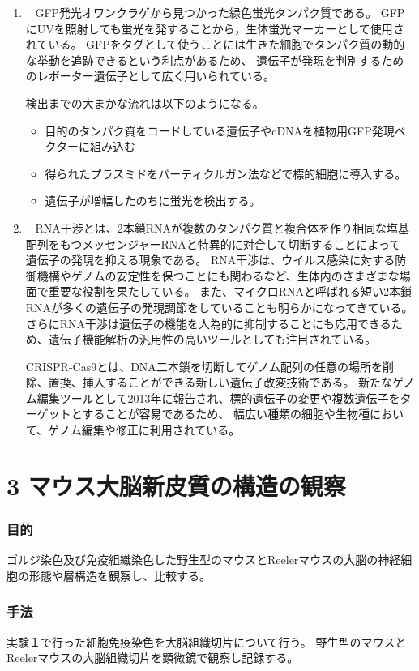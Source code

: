 \documentclass[a4paper,papersize,dvipdfmx]{jsarticle}
\newcommand{\mon}[1]{\item[({#1})] \ }
\begin{document}
\begin{enumerate}
\mon{1}
GFP発光オワンクラゲから見つかった緑色蛍光タンパク質である。
GFPにUVを照射しても蛍光を発することから，生体蛍光マーカーとして使用されている。
GFPをタグとして使うことには生きた細胞でタンパク質の動的な挙動を追跡できるという利点があるため、
遺伝子が発現を判別するためのレポーター遺伝子として広く用いられている。

検出までの大まかな流れは以下のようになる。
\begin{itemize}
\item 目的のタンパク質をコードしている遺伝子やcDNAを植物用GFP発現ベクターに組み込む
\item 得られたプラスミドをパーティクルガン法などで標的細胞に導入する。
\item 遺伝子が増幅したのちに蛍光を検出する。
\end{itemize}

\mon{2}
RNA干渉とは、2本鎖RNAが複数のタンパク質と複合体を作り相同な塩基配列をもつメッセンジャーRNAと特異的に対合して切断することによって
遺伝子の発現を抑える現象である。
RNA干渉は、ウイルス感染に対する防御機構やゲノムの安定性を保つことにも関わるなど、生体内のさまざまな場面で重要な役割を果たしている。
また、マイクロRNAと呼ばれる短い2本鎖RNAが多くの遺伝子の発現調節をしていることも明らかになってきている。
さらにRNA干渉は遺伝子の機能を人為的に抑制することにも応用できるため、遺伝子機能解析の汎用性の高いツールとしても注目されている。

CRISPR-Cas9とは、DNA二本鎖を切断してゲノム配列の任意の場所を削除、置換、挿入することができる新しい遺伝子改変技術である。
新たなゲノム編集ツールとして2013年に報告され、標的遺伝子の変更や複数遺伝子をターゲットとすることが容易であるため、
幅広い種類の細胞や生物種において、ゲノム編集や修正に利用されている。
\end{enumerate}

\part*{3 マウス大脳新皮質の構造の観察}

\section*{目的}
ゴルジ染色及び免疫組織染色した野生型のマウスとReelerマウスの大脳の神経細胞の形態や層構造を観察し、比較する。

\section*{手法}
実験１で行った細胞免疫染色を大脳組織切片について行う。
野生型のマウスとReelerマウスの大脳組織切片を顕微鏡で観察し記録する。
\end{document}

